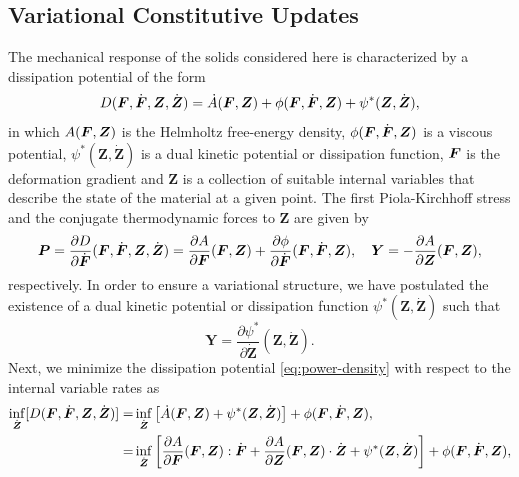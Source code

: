 \documentclass[12pt]{article}
\newcommand{\mbs}[1]{\boldsymbol{#1}}
\def\bP{{\mbs{P}}} \def\bQ{{\mbs{Q}}} \def\bR{{\mbs{R}}}
\def\bY{{\mbs{Y}}} \def\bZ{{\mbs{Z}}}
\numberwithin{equation}{section}
\begin{document}
\subsection{Variational Constitutive Updates}

The mechanical response of the solids considered here is characterized
by a dissipation potential of the form
\begin{equation} \label{eq:power-density}
  D(\bF, \dot{\bF}, \bZ, \dot{\bZ})
  =
  \dot{A}(\bF, \bZ)
  +
  \phi(\bF, \dot{\bF}, \bZ)
  +
  \psi^*(\bZ, \dot{\bZ}),
\end{equation}
in which $A(\bF, \bZ)$ is the Helmholtz free-energy density,
$\phi(\bF, \dot{\bF}, \bZ)$ is a viscous potential, $\psi^*(\bZ,
\dot{\bZ})$ is a dual kinetic potential or dissipation function, $\bF$
is the deformation gradient and $\bZ$ is a collection of suitable
internal variables that describe the state of the material at a given
point. The first Piola-Kirchhoff stress and the conjugate
thermodynamic forces to $\bZ$ are given by
\begin{equation} \label{eq:1PKstress-and-Y}
  \bP
  =
  \frac{\partial D}{\partial \dot{\bF}}(\bF, \dot{\bF}, \bZ, \dot{\bZ})
  =
  \frac{\partial A}{\partial \bF}(\bF, \bZ)
  +
  \frac{\partial \phi}{\partial \dot{\bF}}(\bF, \dot{\bF}, \bZ),
  \quad
  \bY = - \frac{\partial A}{\partial \bZ} (\bF, \bZ),
\end{equation} 
respectively. In order to ensure a variational structure, we have
postulated the existence of a dual kinetic potential or dissipation
function $\psi^*(\bZ, \dot{\bZ})$ such that
\begin{equation} \label{eq:dual-kinetic-potential}
  \bY = \frac{\partial \psi^*}{\partial \dot{\bZ}} (\bZ, \dot{\bZ}).
\end{equation}
Next, we minimize the dissipation potential \eqref{eq:power-density}
with respect to the internal variable rates as
\begin{equation}
  \begin{split}
    \inf_{\dot{\bZ}} [ D(\bF, \dot{\bF}, \bZ, \dot{\bZ}) ]
    =
    &
    \inf_{\dot{\bZ}}
    \left[
      \dot{A}(\bF, \bZ)
      +
      \psi^*(\bZ, \dot{\bZ})
    \right] +
    \phi(\bF, \dot{\bF}, \bZ),
    \\
    =
    &
    \inf_{\dot{\bZ}}
    \left[
      \frac{\partial A}{\partial \bF}(\bF, \bZ) : \dot{\bF}
      +
      \frac{\partial A}{\partial \bZ}(\bF, \bZ) \cdot \dot{\bZ}
      +
      \psi^*(\bZ, \dot{\bZ})
    \right] +
    \phi(\bF, \dot{\bF}, \bZ),
  \end{split}
\end{equation}
\end{document}

